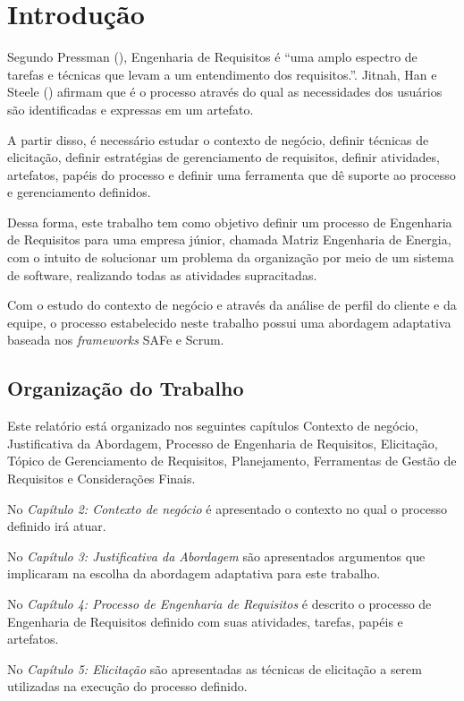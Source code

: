 \chapter[Introdução]{Introdução}

Segundo Pressman (\citeyear{pressman}), Engenharia de Requisitos é ``uma amplo
espectro de tarefas e técnicas que levam a um entendimento dos requisitos.''.
Jitnah, Han e Steele (\citeyear{jitnah}) afirmam que é o processo através do qual as necessidades dos usuários 
são identificadas e expressas em um artefato.

A partir disso, é necessário estudar o contexto de negócio, definir técnicas de elicitação, 
definir estratégias de gerenciamento de requisitos, definir atividades, artefatos, papéis do processo
e definir uma ferramenta que dê suporte ao processo e gerenciamento definidos.

Dessa forma, este trabalho tem como objetivo definir um processo de Engenharia de Requisitos para uma empresa júnior, chamada
Matriz Engenharia de Energia, com o intuito de solucionar um problema da organização por meio de um sistema de software,
realizando todas as atividades supracitadas.

Com o estudo do contexto de negócio e através da análise de perfil do cliente e da equipe, o processo
estabelecido neste trabalho possui uma abordagem adaptativa baseada nos \textit{frameworks} SAFe e Scrum.

\section{Organização do Trabalho}

Este relatório está organizado nos seguintes capítulos Contexto de negócio, Justificativa da Abordagem, 
Processo de Engenharia de Requisitos, Elicitação, Tópico de Gerenciamento de Requisitos,
Planejamento, Ferramentas de Gestão de Requisitos e Considerações Finais.

No \textit{Capítulo 2: Contexto de negócio} é apresentado o contexto no qual o processo
definido irá atuar.

No \textit{Capítulo 3: Justificativa da Abordagem} são apresentados argumentos
que implicaram na escolha da abordagem adaptativa para este trabalho.

No \textit{Capítulo 4: Processo de Engenharia de Requisitos} é descrito o processo de Engenharia
de Requisitos definido com suas atividades, tarefas, papéis e artefatos.

No \textit{Capítulo 5: Elicitação} são apresentadas as técnicas de elicitação
a serem utilizadas na execução do processo definido.

